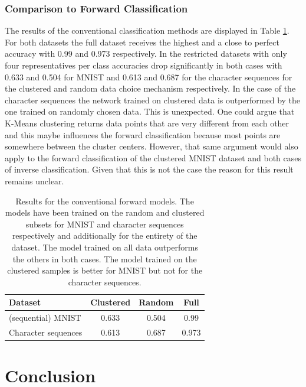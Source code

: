 \documentclass{article}
\begin{document}
\subsubsection{Comparison to Forward Classification}

The results of the conventional classification methods are displayed in Table \ref{table:forward_comparison}. For both datasets the full dataset receives the highest and a close to perfect accuracy with 0.99 and 0.973 respectively. In the restricted datasets with only four representatives per class accuracies drop significantly in both cases with 0.633 and 0.504 for MNIST and 0.613 and 0.687 for the character sequences for the clustered and random data choice mechanism respectively. In the case of the character sequences the network trained on clustered data is outperformed by the one trained on randomly chosen data. This is unexpected. One could argue that K-Means clustering returns data points that are very different from each other and this maybe influences the forward classification because most points are somewhere between the cluster centers. However, that same argument would also apply to the forward classification of the clustered MNIST dataset and both cases of inverse classification. Given that this is not the case the reason for this result remains unclear. 

\begin{table}[!htb]
	\centering
	\caption{Results for the conventional forward models. The models have been trained on the random and clustered subsets for MNIST and character sequences respectively and additionally for the entirety of the dataset. The model trained on all data outperforms the others in both cases. The model trained on the clustered samples is better for MNIST but not for the character sequences.}
	\begin{tabular}{l|ccc}
		\toprule
		Dataset &  Clustered & Random & Full \\
		\midrule
		(sequential) MNIST & 0.633 & 0.504 & 0.99 \\
		Character sequences & 0.613 & 0.687 & 0.973 \\
		\bottomrule
	\end{tabular}
	\label{table:forward_comparison}
\end{table}

\section{Conclusion}
\end{document}
